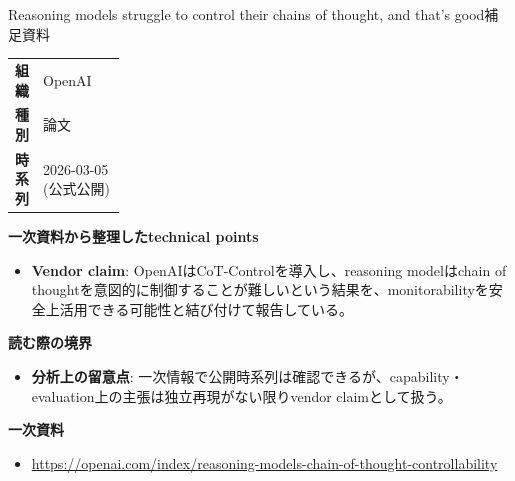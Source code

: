 \begin{technicalnote}{Reasoning models struggle to control their chains of thought, and that’s good}{補足資料}
\begingroup
\begin{tabularx}{\linewidth}{@{}>{\bfseries}p{0.22\linewidth}X@{}}
組織 & OpenAI \\
種別 & 論文 \\
時系列 & 2026-03-05 (公式公開) \\
\end{tabularx}
\smallskip
{\bfseries 一次資料から整理したtechnical points}
\begin{itemize}[leftmargin=1.5em,itemsep=0.35em]
\item \textbf{Vendor claim}: OpenAIはCoT-Controlを導入し、reasoning modelはchain of thoughtを意図的に制御することが難しいという結果を、monitorabilityを安全上活用できる可能性と結び付けて報告している。
\end{itemize}
\begin{minipage}{\linewidth}
{\bfseries 読む際の境界}
\begin{itemize}[leftmargin=1.5em,itemsep=0.35em]
\item \textbf{分析上の留意点}: 一次情報で公開時系列は確認できるが、capability・evaluation上の主張は独立再現がない限りvendor claimとして扱う。
\end{itemize}
\begin{samepage}
{\bfseries 一次資料}
\begingroup\sloppy
\begin{itemize}[leftmargin=1.5em,itemsep=0.25em]
\item {\scriptsize\url{https://openai.com/index/reasoning-models-chain-of-thought-controllability}}
\end{itemize}
\endgroup
\end{samepage}
\end{minipage}
\endgroup
\end{technicalnote}
\medskip

